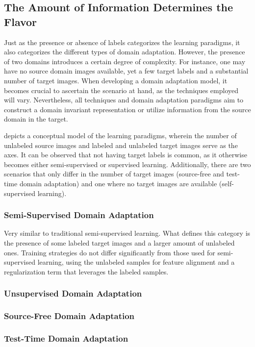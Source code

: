 \subsection{The Amount of Information Determines the Flavor}
Just as the presence or absence of labels categorizes the learning paradigms, it also categorizes the different types of domain adaptation. However, the presence of two domains introduces a certain degree of complexity. For instance, one may have no source domain images available, yet a few target labels and a substantial number of target images. When developing a domain adaptation model, it becomes crucial to ascertain the scenario at hand, as the techniques employed will vary. Nevertheless, all techniques and domain adaptation paradigms aim to construct a domain invariant representation or utilize information from the source domain in the target. 

 depicts a conceptual model of the learning paradigms, wherein the number of unlabeled source images and labeled and unlabeled target images serve as the axes. It can be observed that not having target labels is common, as it otherwise becomes either semi-supervised or supervised learning. Additionally, there are two scenarios that only differ in the number of target images (source-free and test-time domain adaptation) and one where no target images are available (self-supervised learning).

\subsubsection{Semi-Supervised Domain Adaptation} Very similar to traditional semi-supervised learning. What defines this category is the presence of some labeled target images and a larger amount of unlabeled ones. Training strategies do not differ significantly from those used for semi-supervised learning, using the unlabeled samples for feature alignment and a regularization term that leverages the labeled samples.

\subsubsection{Unsupervised Domain Adaptation} 

\subsubsection{Source-Free Domain Adaptation}

\subsubsection{Test-Time Domain Adaptation}